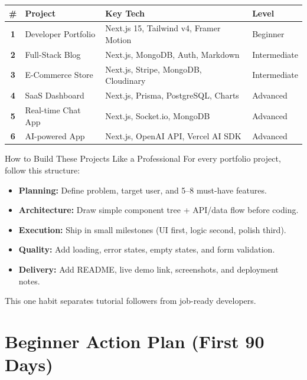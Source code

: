 \documentclass[12pt,a4paper]{article}
\begin{document}
\begin{center}
\begin{tabularx}{\textwidth}{|>{\bfseries}c|l|X|>{\centering\arraybackslash}p{2.2cm}|}
\hline
\rowcolor{FaranDark}
\color{white}\textbf{\#} & \color{white}\textbf{Project} & \color{white}\textbf{Key Tech} & \color{white}\textbf{Level} \\
\hline
1 & Developer Portfolio & Next.js 15, Tailwind v4, Framer Motion & Beginner \\
\hline
\rowcolor{FaranLight}
2 & Full-Stack Blog & Next.js, MongoDB, Auth, Markdown & Intermediate \\
\hline
3 & E-Commerce Store & Next.js, Stripe, MongoDB, Cloudinary & Intermediate \\
\hline
\rowcolor{FaranLight}
4 & SaaS Dashboard & Next.js, Prisma, PostgreSQL, Charts & Advanced \\
\hline
5 & Real-time Chat App & Next.js, Socket.io, MongoDB & Advanced \\
\hline
\rowcolor{FaranLight}
6 & AI-powered App & Next.js, OpenAI API, Vercel AI SDK & Advanced \\
\hline
\end{tabularx}
\end{center}

\begin{infobox}{How to Build These Projects Like a Professional}
For every portfolio project, follow this structure:
\begin{itemize}[leftmargin=1.5em, itemsep=4pt]
    \item[\ding{52}] \textbf{Planning:} Define problem, target user, and 5--8 must-have features.
    \item[\ding{52}] \textbf{Architecture:} Draw simple component tree + API/data flow before coding.
    \item[\ding{52}] \textbf{Execution:} Ship in small milestones (UI first, logic second, polish third).
    \item[\ding{52}] \textbf{Quality:} Add loading, error states, empty states, and form validation.
    \item[\ding{52}] \textbf{Delivery:} Add README, live demo link, screenshots, and deployment notes.
\end{itemize}
This one habit separates tutorial followers from job-ready developers.
\end{infobox}

\newpage

\section{Beginner Action Plan (First 90 Days)}
\end{document}
